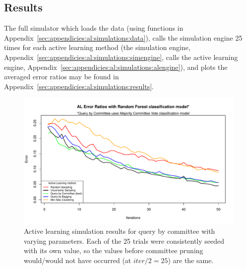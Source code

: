 \subsection{Results}
\label{sec:al:simulation:results}

The full simulator which loads the data (using functions in 
Appendix~\ref{sec:appendicies:al:simulations:data}), calls the simulation 
engine 25 times for each active learning method (the simulation engine, 
Appendix~\ref{sec:appendicies:al:simulations:simengine}, calls the active 
learning engine, Appendix~\ref{sec:appendicies:al:simulations:alengine}), 
and plots the averaged error ratios may be found in 
Appendix~\ref{sec:appendicies:al:simulations:results}.

\begin{figure}[htb]
	\begin{center}
		\includegraphics[width=1\linewidth,page=2]{ch-al/figures/results.pdf}
		\caption[Active learning simulation results for query by committee with 
		varying parameters.]{Active learning simulation results for query by 
			committee with varying parameters. Each of the 25 trials were 
			consistently seeded with its own value, so the values before 
			committee pruning would/would not have occurred (at $iter/2=25$) 
			are the same. }
		\label{fig:al:simulations:resultsqbc}
	\end{center}
\end{figure}

